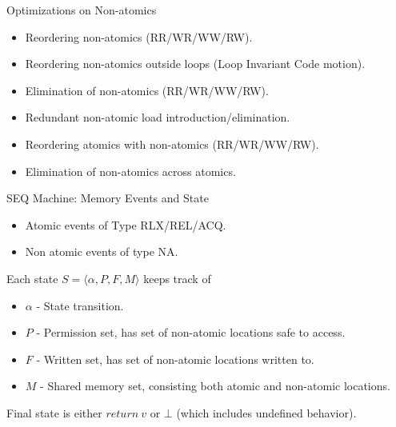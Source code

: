 \documentclass[xcolor=dvipsnames, notes]{beamer}
\begin{document}
    \begin{frame}{Optimizations on Non-atomics}

        \begin{itemize}
            \item Reordering non-atomics (RR/WR/WW/RW).
            \item Reordering non-atomics outside loops (Loop Invariant Code motion).
            \item Elimination of non-atomics (RR/WR/WW/RW).
            \item Redundant non-atomic load introduction/elimination. 
            \item Reordering atomics with non-atomics (RR/WR/WW/RW).
            \item Elimination of non-atomics across atomics.  
        \end{itemize}
        
    \end{frame}

    
    \begin{frame}{SEQ Machine: Memory Events and State}

        \begin{itemize}
            \item Atomic events of Type RLX/REL/ACQ.
            \item Non atomic events of type NA.
        \end{itemize}

        Each state $S = \langle \alpha , P, F , M \rangle$ keeps track of
        \begin{itemize}
            \item $\alpha$ - State transition.
            \item $P$ - Permission set, has set of non-atomic locations safe to access.
            \item $F$ - Written set, has set of non-atomic locations written to. 
            \item $M$ - Shared memory set, consisting both atomic and non-atomic locations. 
        \end{itemize}
    
        Final state is either $return \ v$ or $\bot$ (which includes undefined behavior).
        
    \end{frame}
\end{document}
